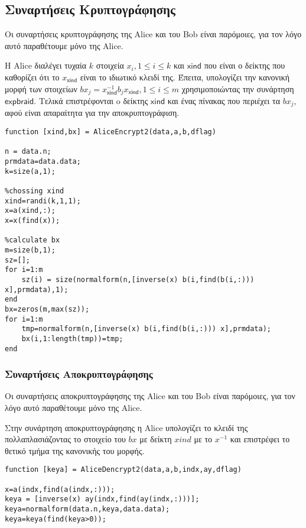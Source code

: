 \documentclass[a4paper,11pt]{article}
\newcommand\ntext[1]{\ensuremath{\mathsf{#1}}}
\begin{document}
\subsection{Συναρτήσεις Κρυπτογράφησης}

Οι συναρτήσεις κρυπτογράφησης της Alice και του Bob είναι παρόμοιες, για τον λόγο αυτό παραθέτουμε μόνο της Alice.

Η Alice διαλέγει τυχαία $ k $ στοιχεία $ x_i, 1 \leq i \leq k $ και \ntext{xind}  που είναι ο δείκτης που καθορίζει ότι το $ x_{\ntext{xind}} $ είναι το ιδιωτικό κλειδί της. Έπειτα, υπολογίζει την κανονική μορφή των στοιχείων $bx_j= x_{\ntext{xind}}^{-1} b_j x_{\ntext{xind}}, 1 \leq i \leq m $ χρησιμοποιώντας την συνάρτηση \ntext{expbraid}. Τελικά επιστρέφονται o δείκτης \ntext{xind} και ένας πίνακας που περιέχει τα $ bx_j $, αφού είναι απαραίτητα για την αποκρυπτογράφιση.

\begin{lstlisting}
function [xind,bx] = AliceEncrypt2(data,a,b,dflag)

n = data.n;
prmdata=data.data;
k=size(a,1);

%chossing xind
xind=randi(k,1,1);
x=a(xind,:);
x=x(find(x));

%calculate bx
m=size(b,1);
sz=[];
for i=1:m
    sz(i) = size(normalform(n,[inverse(x) b(i,find(b(i,:))) x],prmdata),1);
end
bx=zeros(m,max(sz));
for i=1:m
    tmp=normalform(n,[inverse(x) b(i,find(b(i,:))) x],prmdata);
    bx(i,1:length(tmp))=tmp;
end
\end{lstlisting}  

\subsubsection{Συναρτήσεις Αποκρυπτογράφησης}

Οι συναρτήσεις αποκρυπτογράφησης της Alice και του Bob είναι παρόμοιες, για τον λόγο αυτό παραθέτουμε μόνο της Alice.

Στην συνάρτηση αποκρυπτογράφησης η Alice υπολογίζει το κλειδί της πολλαπλασιάζοντας το στοιχείο του $ bx $ με δείκτη $ xind$ με το $ x^{-1} $ και επιστρέφει το θετικό τμήμα της κανονικής του μορφής.
\begin{lstlisting}
function [keya] = AliceDencrypt2(data,a,b,indx,ay,dflag)

x=a(indx,find(a(indx,:)));
keya = [inverse(x) ay(indx,find(ay(indx,:)))];
keya=normalform(data.n,keya,data.data);
keya=keya(find(keya>0));
\end{lstlisting}
\end{document}
